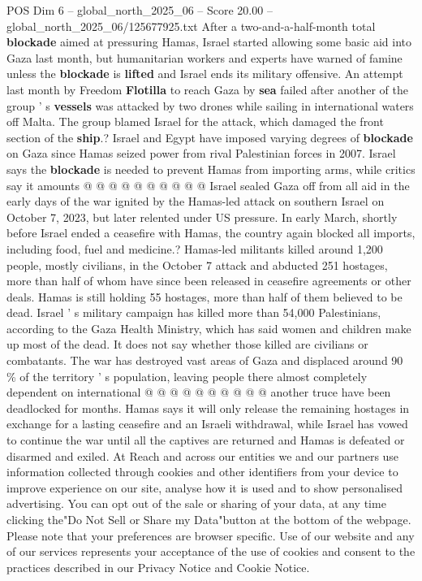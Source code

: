 \begin{textsample}{POS Dim 6 – global\_north\_2025\_06 – Score 20.00 – global\_north\_2025\_06/125677925.txt}
After a two-and-a-half-month total \textbf{blockade} aimed at pressuring Hamas, Israel started allowing some basic aid into Gaza last month, but humanitarian workers and experts have warned of famine unless the \textbf{blockade} is \textbf{lifted} and Israel ends its military offensive.
An attempt last month by Freedom \textbf{Flotilla} to reach Gaza by \textbf{sea} failed after another of the group ' s \textbf{vessels} was attacked by two drones while sailing in international waters off Malta.
The group blamed Israel for the attack, which damaged the front section of the \textbf{ship}.?
Israel and Egypt have imposed varying degrees of \textbf{blockade} on Gaza since Hamas seized power from rival Palestinian forces in 2007.
Israel says the \textbf{blockade} is needed to prevent Hamas from importing arms, while critics say it amounts @ @ @ @ @ @ @ @ @ @ Israel sealed Gaza off from all aid in the early days of the war ignited by the Hamas-led attack on southern Israel on October 7, 2023, but later relented under US pressure.
In early March, shortly before Israel ended a ceasefire with Hamas, the country again blocked all imports, including food, fuel and medicine.?
Hamas-led militants killed around 1,200 people, mostly civilians, in the October 7 attack and abducted 251 hostages, more than half of whom have since been released in ceasefire agreements or other deals.
Hamas is still holding 55 hostages, more than half of them believed to be dead.
Israel ' s military campaign has killed more than 54,000 Palestinians, according to the Gaza Health Ministry, which has said women and children make up most of the dead.
It does not say whether those killed are civilians or combatants.
The war has destroyed vast areas of Gaza and displaced around 90 \% of the territory ' s population, leaving people there almost completely dependent on international @ @ @ @ @ @ @ @ @ @ another truce have been deadlocked for months.
Hamas says it will only release the remaining hostages in exchange for a lasting ceasefire and an Israeli withdrawal, while Israel has vowed to continue the war until all the captives are returned and Hamas is defeated or disarmed and exiled.
At Reach and across our entities we and our partners use information collected through cookies and other identifiers from your device to improve experience on our site, analyse how it is used and to show personalised advertising.
You can opt out of the sale or sharing of your data, at any time clicking the"Do Not Sell or Share my Data"button at the bottom of the webpage.
Please note that your preferences are browser specific.
Use of our website and any of our services represents your acceptance of the use of cookies and consent to the practices described in our Privacy Notice and Cookie Notice.

\end{textsample}
